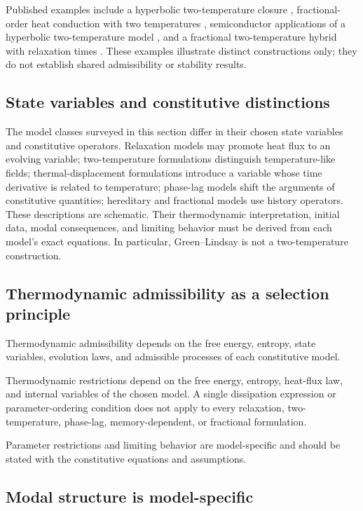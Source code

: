 Published examples include a hyperbolic two-temperature closure \cite{Prasad2020}, fractional-order heat conduction with two temperatures \cite{Ezzat2011}, semiconductor applications of a hyperbolic two-temperature model \cite{Alzahrani2020}, and a fractional two-temperature hybrid with relaxation times \cite{Bassiouny2020}. These examples illustrate distinct constructions only; they do not establish shared admissibility or stability results.

\subsection{State variables and constitutive distinctions}
\label{sec:4.13}

The model classes surveyed in this section differ in their chosen state variables and constitutive operators. Relaxation models may promote heat flux to an evolving variable; two-temperature formulations distinguish temperature-like fields; thermal-displacement formulations introduce a variable whose time derivative is related to temperature; phase-lag models shift the arguments of constitutive quantities; hereditary and fractional models use history operators. These descriptions are schematic. Their thermodynamic interpretation, initial data, modal consequences, and limiting behavior must be derived from each model's exact equations. In particular, Green--Lindsay is not a two-temperature construction.

\subsection{Thermodynamic admissibility as a selection principle}
\label{sec:4.14}

Thermodynamic admissibility depends on the free energy, entropy, state variables, evolution laws, and admissible processes of each constitutive model.

Thermodynamic restrictions depend on the free energy, entropy, heat-flux law, and internal variables of the chosen model. A single dissipation expression or parameter-ordering condition does not apply to every relaxation, two-temperature, phase-lag, memory-dependent, or fractional formulation.

Parameter restrictions and limiting behavior are model-specific and should be stated with the constitutive equations and assumptions.

\subsection{Modal structure is model-specific}
\label{sec:4.15}

